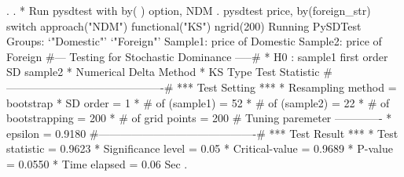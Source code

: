 . 
. * Run pysdtest with by( ) option, NDM
. pysdtest price, by(foreign_str) switch approach("NDM") functional("KS") ngrid(200)
Running PySDTest
Groups:
`"Domestic"' `"Foreign"'
Sample1: price of Domestic
Sample2: price of Foreign
{\smallskip}
\#--- Testing for Stochastic Dominance  -----\#
{\smallskip}
* H0 : sample1 first order SD sample2
* Numerical Delta Method
* KS Type Test Statistic 
{\smallskip}
\#-------------------------------------------\#
{\smallskip}
*** Test Setting ***
* Resampling method      = bootstrap
* SD order               =      1
* \# of (sample1)         =     52 
* \# of (sample2)         =     22
* \# of bootstrapping     =    200
* \# of grid points       =    200
{\smallskip}
\# Tuning paremeter -------------
* epsilon                = 0.9180
{\smallskip}
\#-------------------------------------------\#
{\smallskip}
*** Test Result ***
* Test statistic         = 0.9623
* Significance level     =  0.05
* Critical-value         = 0.9689
* P-value                = 0.0550
* Time elapsed           =  0.06 Sec
{\smallskip}
. 
